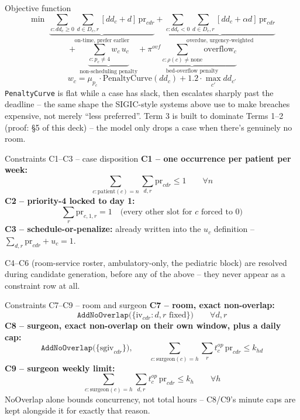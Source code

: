 \documentclass[aspectratio=169]{beamer}
\begin{document}
\begin{frame}{Objective function}
  \[
    \min \;
    \underbrace{\sum_{c:dd_c\ge0}\sum_{d\in D_c,r}[dd_c+d]\,\text{pr}_{cdr}}_{\text{on-time, prefer earlier}}
    +
    \underbrace{\sum_{c:dd_c<0}\sum_{d\in D_c,r}[dd_c+\alpha d]\,\text{pr}_{cdr}}_{\text{overdue, urgency-weighted}}
  \]
  \[
    {}+\;
    \underbrace{\sum_{c:p_c\ne4} w_c\,u_c}_{\text{non-scheduling penalty}}
    +
    \underbrace{\pi^{ovf}\sum_{c:\rho(c)\ne\text{none}}\text{overflow}_c}_{\text{bed-overflow penalty}}
  \]
  \[
    w_c = \mu_{p_c}\cdot\text{PenaltyCurve}(dd_c) + 1.2\cdot\max_{c'} dd_{c'}
  \]
  \footnotesize \texttt{PenaltyCurve} is flat while a case has slack, then
  escalates sharply past the deadline -- the same shape the SIGIC-style
  systems above use to make breaches expensive, not merely ``less
  preferred''. Term 3 is built to dominate Terms 1--2 (proof: \S5 of this
  deck) -- the model only drops a case when there's genuinely no room.
\end{frame}

\begin{frame}{Constraints C1--C3 -- case disposition}
  \textbf{C1 -- one occurrence per patient per week:}
  \[
    \sum_{c:\text{patient}(c)=n}\sum_{d,r}\text{pr}_{cdr} \le 1 \qquad \forall n
  \]
  \textbf{C2 -- priority-4 locked to day 1:}
  \[
    \sum_r \text{pr}_{c,1,r} = 1 \quad\text{(every other slot for $c$ forced to 0)}
  \]
  \textbf{C3 -- schedule-or-penalize:} already written into the $u_c$
  definition -- $\sum_{d,r}\text{pr}_{cdr}+u_c=1$.
  \vspace{1em}

  \footnotesize C4--C6 (room-service roster, ambulatory-only, the
  pediatric block) are resolved during candidate generation, before any of
  the above -- they never appear as a constraint row at all.
\end{frame}

\begin{frame}{Constraints C7--C9 -- room and surgeon}
  \textbf{C7 -- room, exact non-overlap:}
  \[
    \texttt{AddNoOverlap}\big(\{\text{iv}_{cdr}: d,r\text{ fixed}\}\big) \qquad \forall d,r
  \]
  \textbf{C8 -- surgeon, exact non-overlap on their own window, plus a
  daily cap:}
  \[
    \texttt{AddNoOverlap}\big(\{\text{sgiv}_{cdr}\}\big), \qquad
    \sum_{c:\text{surgeon}(c)=h}\sum_r t_c^{op}\,\text{pr}_{cdr}\le k_{hd}
  \]
  \textbf{C9 -- surgeon weekly limit:}
  \[
    \sum_{c:\text{surgeon}(c)=h}\sum_{d,r} t_c^{op}\,\text{pr}_{cdr}\le k_h \qquad \forall h
  \]
  \footnotesize NoOverlap alone bounds concurrency, not total hours -- C8/C9's
  minute caps are kept alongside it for exactly that reason.
\end{frame}
\end{document}
